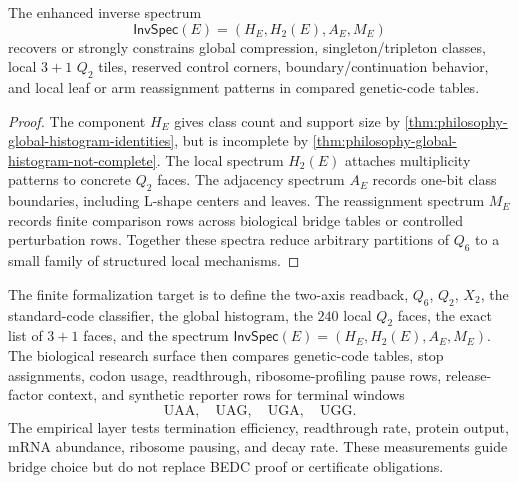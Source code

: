 \begin{theorem}
\label{thm:philosophy-enhanced-inverse-spectrum-theorem}
The enhanced inverse spectrum
$$
  \mathsf{InvSpec}(E)=(H_{E},H_{2}(E),A_{E},M_{E})
$$
recovers or strongly constrains global compression, singleton/tripleton
classes, local $3+1$ $Q_{2}$ tiles, reserved control corners,
boundary/continuation behavior, and local leaf or arm reassignment
patterns in compared genetic-code tables.
\end{theorem}
\begin{proof}
The component $H_{E}$ gives class count and support size by
\autoref{thm:philosophy-global-histogram-identities}, but is incomplete
by \autoref{thm:philosophy-global-histogram-not-complete}. The local
spectrum $H_{2}(E)$ attaches multiplicity patterns to concrete $Q_{2}$
faces. The adjacency spectrum $A_{E}$ records one-bit class boundaries,
including L-shape centers and leaves. The reassignment spectrum $M_{E}$
records finite comparison rows across biological bridge tables or
controlled perturbation rows. Together these spectra reduce arbitrary
partitions of $Q_{6}$ to a small family of structured local mechanisms.
\end{proof}

\begin{definition}
\label{def:philosophy-spectral-inverse-work-surface}
The finite formalization target is to define the two-axis readback,
$Q_{6}$, $Q_{2}$, $X_{2}$, the standard-code classifier, the global
histogram, the $240$ local $Q_{2}$ faces, the exact list of $3+1$ faces,
and the spectrum $\mathsf{InvSpec}(E)=(H_{E},H_{2}(E),A_{E},M_{E})$. The
biological research surface then compares genetic-code tables, stop
assignments, codon usage,
readthrough, ribosome-profiling pause rows, release-factor context, and
synthetic reporter rows for terminal windows
$$
  \mathrm{UAA},\quad
  \mathrm{UAG},\quad
  \mathrm{UGA},\quad
  \mathrm{UGG}.
$$
The empirical layer tests termination efficiency, readthrough rate,
protein output, mRNA abundance, ribosome pausing, and decay rate. These
measurements guide bridge choice but do not replace BEDC proof or
certificate obligations.
\end{definition}

